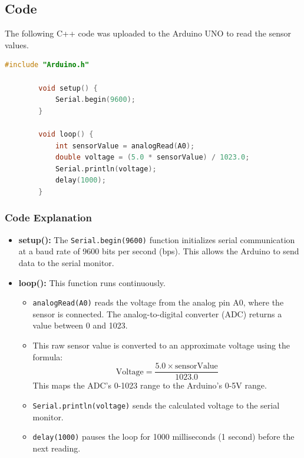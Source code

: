 \documentclass{article}
\begin{document}
	\subsection{Code}
	The following C++ code was uploaded to the Arduino UNO to read the sensor values.
	
	\begin{lstlisting}[language=C++, caption={Arduino Code for Reading Sensor Voltage}, label={lst:code}]
		#include "Arduino.h"
		
		void setup() {
			Serial.begin(9600);
		}
		
		void loop() {
			int sensorValue = analogRead(A0);
			double voltage = (5.0 * sensorValue) / 1023.0;
			Serial.println(voltage);
			delay(1000);
		}
	\end{lstlisting}
	
	\subsubsection*{Code Explanation}
	\begin{itemize}
		\item \textbf{setup():} The \texttt{Serial.begin(9600)} function initializes serial communication at a baud rate of 9600 bits per second (bps). This allows the Arduino to send data to the serial monitor.
		\item \textbf{loop():} This function runs continuously.
		\begin{itemize}
			\item \texttt{analogRead(A0)} reads the voltage from the analog pin A0, where the sensor is connected. The analog-to-digital converter (ADC) returns a value between 0 and 1023.
			\item This raw sensor value is converted to an approximate voltage using the formula:
			\[
			\text{Voltage} = \frac{5.0 \times \text{sensorValue}}{1023.0}
			\]
			This maps the ADC's 0-1023 range to the Arduino's 0-5V range.
			\item \texttt{Serial.println(voltage)} sends the calculated voltage to the serial monitor.
			\item \texttt{delay(1000)} pauses the loop for 1000 milliseconds (1 second) before the next reading.
		\end{itemize}
	\end{itemize}
	
\end{document}
